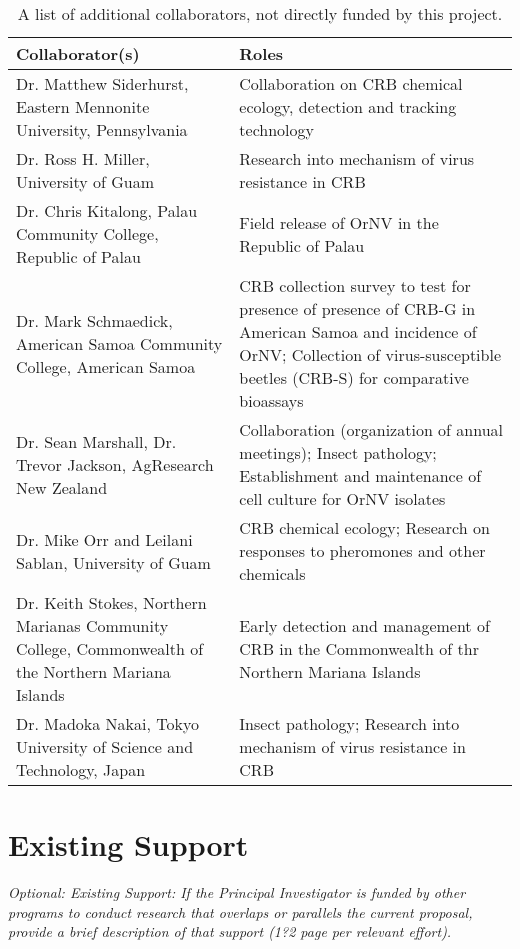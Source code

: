 \documentclass[11pt,english,letterpaper]{scrartcl}
\begin{document}
\begin{table}[h]
	\centering
	\caption{A list of additional collaborators, not directly funded by this project.}	
	
	\begin{tabular}{p{2.2in}p{4in}}
		\toprule
		\textbf{Collaborator(s)} & \textbf{Roles} \\ \midrule
		
		Dr. Matthew Siderhurst, Eastern Mennonite University, Pennsylvania & Collaboration on CRB chemical ecology, detection and tracking technology \\ \midrule
		
		Dr. Ross H. Miller, University of Guam & Research into mechanism of virus resistance in CRB \\ \midrule
		
		Dr. Chris Kitalong, Palau Community College, Republic of Palau & Field release of OrNV in the Republic of Palau \\ \midrule
		
		Dr. Mark Schmaedick, American Samoa Community College, American Samoa & CRB collection survey to test for presence of presence of CRB-G in American Samoa and incidence of OrNV; Collection of virus-susceptible beetles (CRB-S) for comparative bioassays \\ \midrule
		
		Dr. Sean Marshall, Dr. Trevor Jackson, AgResearch New Zealand & Collaboration (organization of annual meetings); Insect pathology; Establishment and maintenance of cell culture for OrNV isolates \\ \midrule
		
		Dr. Mike Orr and Leilani Sablan, University of Guam & CRB chemical ecology; Research on responses to pheromones and other chemicals \\ \midrule
		
		Dr. Keith Stokes, Northern Marianas Community College, Commonwealth of the Northern Mariana Islands & Early detection and management of CRB in the Commonwealth of thr Northern Mariana Islands \\ \midrule
		
		Dr. Madoka Nakai, Tokyo University of Science and Technology, Japan & Insect pathology; Research into mechanism of virus resistance in CRB \\ \bottomrule
		
	\end{tabular}
	\label{tbl:team-additional}	
\end{table}

\newpage

\section{Existing Support}

\textit{Optional: Existing Support: If the Principal Investigator is funded by other programs to conduct research that overlaps or parallels the current proposal, provide a brief description of that support (1?2 page per relevant effort).}
\end{document}
